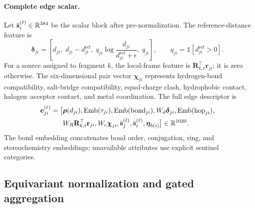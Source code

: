 \paragraph{Complete edge scalar.}
Let \(\bar{\mathbf{s}}_i^{(\ell)}\in\mathbb{R}^{384}\) be the scalar block after
pre-normalization. The reference-distance feature is
\begin{equation}
    \boldsymbol{\delta}_{ji}
    =
    \left[
      d_{ji},\;
      d_{ji}-d^{\mathrm{ref}}_{ji},\;
      q_{ji}\log
      \frac{d_{ji}}{d^{\mathrm{ref}}_{ji}+\epsilon},\;
      q_{ji}
    \right],
    \qquad
    q_{ji}=\mathbb{1}[d^{\mathrm{ref}}_{ji}>0].
    \label{eq:distance_evolution}
\end{equation}
For a source assigned to fragment \(k\), the local-frame feature is
\(\mathbf{R}_{k,t}^{\top}\mathbf{r}_{ji}\); it is zero otherwise. The
six-dimensional pair vector \(\boldsymbol{\chi}_{ji}\) represents
hydrogen-bond compatibility, salt-bridge compatibility, equal-charge clash,
hydrophobic contact, halogen--acceptor contact, and metal coordination. The
full edge descriptor is
\begin{align}
    \mathbf{e}^{(\ell)}_{ji}
    =\big[
      &\boldsymbol{\rho}(d_{ji}),
      \operatorname{Emb}(\tau_{ji}),
      \operatorname{Emb}(\mathrm{bond}_{ji}),
      W_d\boldsymbol{\delta}_{ji},
      \operatorname{Emb}(\mathrm{hop}_{ji}),\nonumber\\
      &W_R\mathbf{R}_{k,t}^{\top}\mathbf{r}_{ji},
      W_c\boldsymbol{\chi}_{ji},
      \bar{\mathbf{s}}_j^{(\ell)},
      \bar{\mathbf{s}}_i^{(\ell)},
      \boldsymbol{\eta}_{b(i)}
    \big]\in\mathbb{R}^{1020}.
    \label{eq:edge_scalar}
\end{align}
The bond embedding concatenates bond order, conjugation, ring, and
stereochemistry embeddings; unavailable attributes use explicit sentinel
categories.

\subsection{Equivariant normalization and gated aggregation}


